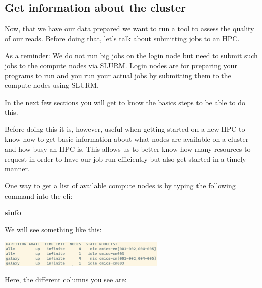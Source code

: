 \documentclass[
  letterpaper,
  DIV=11,
  numbers=noendperiod]{scrreprt}
\newenvironment{Shaded}{}{}
\newcommand{\ExtensionTok}[1]{\textcolor[rgb]{0.84,0.23,0.29}{\textbf{#1}}}
\begin{document}
\subsection{Get information about the
cluster}\label{get-information-about-the-cluster}

Now, that we have our data prepared we want to run a tool to assess the
quality of our reads. Before doing that, let's talk about submitting
jobs to an HPC.

As a reminder: We do not run big jobs on the login node but need to
submit such jobs to the compute nodes via SLURM. Login nodes are for
preparing your programs to run and you run your actual jobs by
submitting them to the compute nodes using SLURM.

In the next few sections you will get to know the basics steps to be
able to do this.

Before doing this it is, however, useful when getting started on a new
HPC to know how to get basic information about what nodes are available
on a cluster and how busy an HPC is. This allows us to better know how
many resources to request in order to have our job run efficiently but
also get started in a timely manner.

One way to get a list of available compute nodes is by typing the
following command into the cli:

\begin{Shaded}
\begin{Highlighting}[]
\ExtensionTok{sinfo}
\end{Highlighting}
\end{Shaded}

We will see something like this:

\begin{center}
\includegraphics[width=0.6\textwidth,height=\textheight]{../img/sinfo.png}
\end{center}

Here, the different columns you see are:
\end{document}
